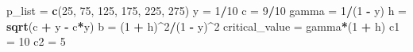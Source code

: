 \documentclass[
]{article}
\newenvironment{Shaded}{\begin{snugshade}}{\end{snugshade}}
\newcommand{\DecValTok}[1]{\textcolor[rgb]{0.00,0.00,0.81}{#1}}
\newcommand{\FunctionTok}[1]{\textcolor[rgb]{0.13,0.29,0.53}{\textbf{#1}}}
\newcommand{\NormalTok}[1]{#1}
\newcommand{\OtherTok}[1]{\textcolor[rgb]{0.56,0.35,0.01}{#1}}
\newcommand{\SpecialCharTok}[1]{\textcolor[rgb]{0.81,0.36,0.00}{\textbf{#1}}}
\begin{document}
\begin{Shaded}
\begin{Highlighting}[]
\NormalTok{p\_list }\OtherTok{=} \FunctionTok{c}\NormalTok{(}\DecValTok{25}\NormalTok{, }\DecValTok{75}\NormalTok{, }\DecValTok{125}\NormalTok{, }\DecValTok{175}\NormalTok{, }\DecValTok{225}\NormalTok{, }\DecValTok{275}\NormalTok{)}
\NormalTok{y }\OtherTok{=} \DecValTok{1}\SpecialCharTok{/}\DecValTok{10}
\NormalTok{c }\OtherTok{=} \DecValTok{9}\SpecialCharTok{/}\DecValTok{10}
\NormalTok{gamma }\OtherTok{=} \DecValTok{1}\SpecialCharTok{/}\NormalTok{(}\DecValTok{1} \SpecialCharTok{{-}}\NormalTok{ y)}
\NormalTok{h }\OtherTok{=} \FunctionTok{sqrt}\NormalTok{(c }\SpecialCharTok{+}\NormalTok{ y }\SpecialCharTok{{-}}\NormalTok{ c}\SpecialCharTok{*}\NormalTok{y)}
\NormalTok{b }\OtherTok{=}\NormalTok{ (}\DecValTok{1} \SpecialCharTok{+}\NormalTok{ h)}\SpecialCharTok{\^{}}\DecValTok{2}\SpecialCharTok{/}\NormalTok{(}\DecValTok{1} \SpecialCharTok{{-}}\NormalTok{ y)}\SpecialCharTok{\^{}}\DecValTok{2}
\NormalTok{critical\_value }\OtherTok{=}\NormalTok{ gamma}\SpecialCharTok{*}\NormalTok{(}\DecValTok{1} \SpecialCharTok{+}\NormalTok{ h)}
\NormalTok{c1 }\OtherTok{=} \DecValTok{10}
\NormalTok{c2 }\OtherTok{=} \DecValTok{5}


\end{Highlighting}
\end{Shaded}
\end{document}
